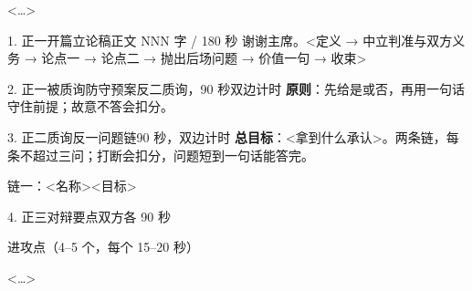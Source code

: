 \documentclass[script,pro]{debate}   %
\begin{document}
\debatetitle
\begin{thesisbox}[全场一句话立论]<…>\end{thesisbox}

\begin{speech}{1. 正一开篇立论稿}{正文 NNN 字 / 180 秒}
谢谢主席。<定义 → 中立判准与双方义务 → 论点一 → 论点二 → 抛出后场问题 → 价值一句 → 收束>
\end{speech}
\begin{contingency}
\end{contingency}

\begin{stage}{2. 正一被质询防守预案}{反二质询，90 秒双边计时}
\textbf{原则}：先给是或否，再用一句话守住前提；故意不答会扣分。
\begin{qa}
\end{qa}
\end{stage}

\begin{stage}{3. 正二质询反一问题链}{90 秒，双边计时}
\textbf{总目标}：<拿到什么承认>。两条链，每条不超过三问；打断会扣分，问题短到一句话能答完。
\begin{chain}{链一：<名称>}{<目标>}
\end{chain}
\end{stage}

\begin{stage}{4. 正三对辩要点}{双方各 90 秒}
\begin{points}{进攻点（4–5 个，每个 15–20 秒）}
\item <…>
\end{points}
\begin{qa}[对方可能的进攻][我方回应]
\end{qa}
\end{stage}
\end{document}
